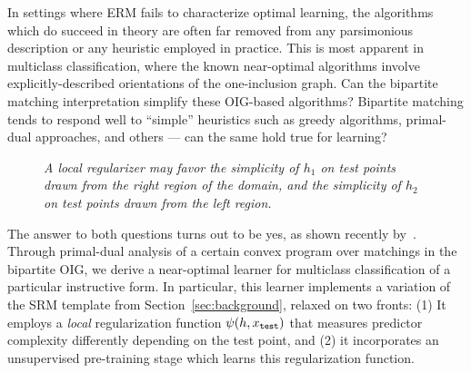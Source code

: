 In settings where ERM fails to characterize optimal learning, the algorithms which do succeed in theory are often far removed from any parsimonious description or any heuristic employed in practice.  This is most apparent in multiclass classification, where the known near-optimal algorithms \cite{daniely_optimal_2014,brukhim_characterization_2022} involve explicitly-described orientations of the one-inclusion graph. Can the bipartite matching interpretation simplify these OIG-based algorithms? Bipartite matching tends to respond well to ``simple'' heuristics such as greedy algorithms, primal-dual approaches, and others --- can the same hold true for learning?


 \begin{figure}
\centering

\caption{\emph{ %
    A  local regularizer may favor the simplicity of $h_1$ on test points drawn from the right region of the domain, and the simplicity of $h_2$ on test points drawn from the left region.}}
\label{fig:local}
\end{figure}

The answer to both questions turns out to be yes, as shown recently by~\citet{asilis_regularization_2024}. Through primal-dual analysis of a certain convex program over matchings in the bipartite OIG, we derive a near-optimal learner for multiclass classification of a particular instructive form. In particular, this learner implements a variation of the SRM template from Section~\ref{sec:background}, relaxed on two fronts: (1) It employs  a  \emph{local} regularization function  $\psi(h,x_{\mathtt{test}})$ that  measures predictor complexity differently depending on the test point, and  (2) it incorporates an unsupervised pre-training stage which learns this regularization function.

